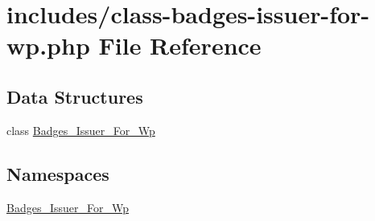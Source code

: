 \hypertarget{class-badges-issuer-for-wp_8php}{}\section{includes/class-\/badges-\/issuer-\/for-\/wp.php File Reference}
\label{class-badges-issuer-for-wp_8php}
\subsection*{Data Structures}
\begin{DoxyCompactItemize}
\item 
class \hyperlink{class_badges___issuer___for___wp}{Badges\+\_\+\+Issuer\+\_\+\+For\+\_\+\+Wp}
\end{DoxyCompactItemize}
\subsection*{Namespaces}
\begin{DoxyCompactItemize}
\item 
 \hyperlink{namespace_badges___issuer___for___wp}{Badges\+\_\+\+Issuer\+\_\+\+For\+\_\+\+Wp}
\end{DoxyCompactItemize}

